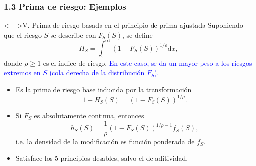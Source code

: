 \documentclass[cjk,t,compress]{beamer}
\newcommand{\dd}{\mathrm{d}}
\begin{document}
\begin{frame}[fragile]
	\frametitle{1.3 Prima de riesgo: Ejemplos}
	\scriptsize  	
		
		\vspace{0.2cm}
		\begin{block}<+->{V. Prima de riesgo basada en el principio de prima ajustada}
		\vspace{0.1cm}
		Suponiendo que el riesgo $S$ se describe con $F_{S}(S)$, se define
		\begin{equation}
			\Pi_{S} = \int_{0}^{\infty}\left(1-F_{S}(S)\right)^{1/\rho}\dd x,
		\end{equation}
		donde $\rho\geq 1$ es el \'indice de riesgo.
		\newline
		\textcolor{blue}{En este caso, se da un mayor peso a los riesgos extremos en $S$ (cola derecha de la distribuci\'on $F_{S}$).}
		
		\begin{itemize}
		  \item Es la prima de riesgo base inducida por la transformaci\'on $$1-H_{S}(S)=(1-F_{S}(S))^{1/\rho}.$$
		  \item Si $F_S$ es absolutamente continua, entonces $$h_{S}(S)=\frac{1}{\rho}\left(1-F_{S}(S)\right)^{1/\rho-1}f_{S}(S),$$
		  i.e. la densidad de la modificaci\'on es funci\'on ponderada de $f_{S}$.
		  \item Satisface los 5 principios desables, salvo el de aditividad.
		\end{itemize}
		\end{block}  		

\end{frame}
\end{document}
